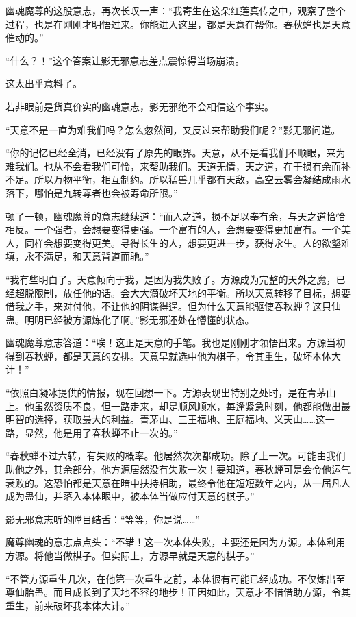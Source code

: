 \begin{this_body}
幽魂魔尊的这股意志，再次长叹一声：“我寄生在这朵红莲真传之中，观察了整个过程，也是在刚刚才明悟过来。你能进入这里，都是天意在帮你。春秋蝉也是天意催动的。”

“什么？！”这个答案让影无邪意志差点震惊得当场崩溃。

这太出乎意料了。

若非眼前是货真价实的幽魂意志，影无邪绝不会相信这个事实。

“天意不是一直为难我们吗？怎么忽然间，又反过来帮助我们呢？”影无邪问道。

“你的记忆已经全消，已经没有了原先的眼界。天意，从不是看我们不顺眼，来为难我们。也从不会看我们可怜，来帮助我们。天道无情，天之道，在于损有余而补不足。所以万物平衡，相互制约。所以猛兽几乎都有天敌，高空云雾会凝结成雨水落下，哪怕是九转尊者也会被寿命所限。”

顿了一顿，幽魂魔尊的意志继续道：“而人之道，损不足以奉有余，与天之道恰恰相反。一个强者，会想要变得更强。一个富有的人，会想要变得更加富有。一个美人，同样会想要变得更美。寻得长生的人，想要更进一步，获得永生。人的欲壑难填，永不满足，和天意背道而驰。”

“我有些明白了。天意倾向于我，是因为我失败了。方源成为完整的天外之魔，已经超脱限制，放任他的话。会大大滴破坏天地的平衡。所以天意转移了目标，想要借我之手，来对付他，不让他的阴谋得逞。但为什么天意能驱使春秋蝉？这只仙蛊。明明已经被方源炼化了啊。”影无邪还处在懵懂的状态。

幽魂魔尊意志答道：“唉！这正是天意的手笔。我也是刚刚才领悟出来。方源当初得到春秋蝉，都是天意的安排。天意早就选中他为棋子，令其重生，破坏本体大计！”

“依照白凝冰提供的情报，现在回想一下。方源表现出特别之处时，是在青茅山上。他虽然资质不良，但一路走来，却是顺风顺水，每逢紧急时刻，他都能做出最明智的选择，获取最大的利益。青茅山、三王福地、王庭福地、义天山……这一路，显然，他是用了春秋蝉不止一次的。”

“春秋蝉不过六转，有失败的概率。他居然次次都成功。除了上一次。可能由我们助他之外，其余部分，他方源居然没有失败一次！要知道，春秋蝉可是会令他运气衰败的。这恐怕都是天意在暗中扶持相助，最终令他在短短数年之内，从一届凡人成为蛊仙，并落入本体眼中，被本体当做应付天意的棋子。”

影无邪意志听的瞠目结舌：“等等，你是说……”

魔尊幽魂的意志点点头：“不错！这一次本体失败，主要还是因为方源。本体利用方源。将他当做棋子。但实际上，方源早就是天意的棋子。”

“不管方源重生几次，在他第一次重生之前，本体很有可能已经成功。不仅炼出至尊仙胎蛊。而且成长到了天地不容的地步！正因如此，天意才不惜借助方源，令其重生，前来破坏我本体大计。”


\end{this_body}
